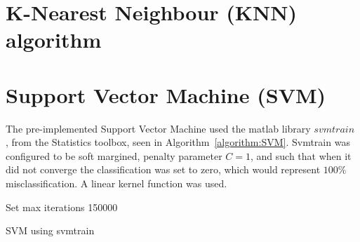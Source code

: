 \section{K-Nearest Neighbour (KNN) algorithm}


\section{Support Vector Machine (SVM)}
The pre-implemented Support Vector Machine used the matlab library $svmtrain$ \citep{svmtrain_ref}, from the Statistics toolbox, seen in Algorithm~\ref{algorithm:SVM}.  Svmtrain was configured to be soft margined, penalty parameter $C = 1$, and such that when it did not converge the classification was set to zero, which would represent $100\%$ misclassification. A linear kernel function was used. \\
\begin{algorithm}[H]
\SetAlgoLined
{}

Set max iterations 150000 \\
 \caption{SVM using svmtrain}
 \label{algorithm:SVM}
\end{algorithm}

